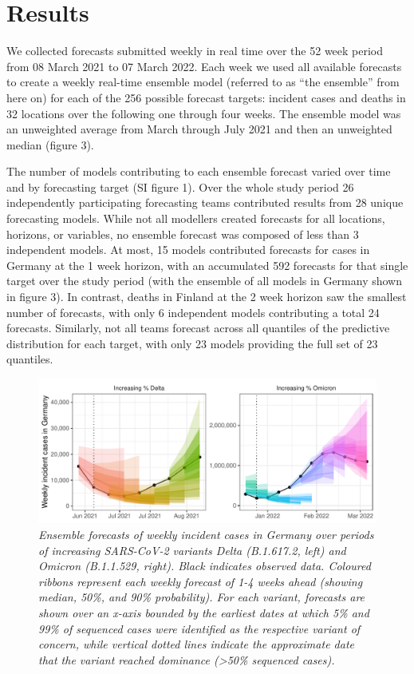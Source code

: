 \documentclass[
]{article}
\begin{document}
\hypertarget{results}{%
\section{Results}\label{results}}

We collected forecasts submitted weekly in real time over the 52 week
period from 08 March 2021 to 07 March 2022. Each week we used all
available forecasts to create a weekly real-time ensemble model
(referred to as ``the ensemble'' from here on) for each of the 256
possible forecast targets: incident cases and deaths in 32 locations
over the following one through four weeks. The ensemble model was an
unweighted average from March through July 2021 and then an unweighted
median (figure 3).

The number of models contributing to each ensemble forecast varied over
time and by forecasting target (SI figure 1). Over the whole study
period 26 independently participating forecasting teams contributed
results from 28 unique forecasting models. While not all modellers
created forecasts for all locations, horizons, or variables, no ensemble
forecast was composed of less than 3 independent models. At most, 15
models contributed forecasts for cases in Germany at the 1 week horizon,
with an accumulated 592 forecasts for that single target over the study
period (with the ensemble of all models in Germany shown in figure 3).
In contrast, deaths in Finland at the 2 week horizon saw the smallest
number of forecasts, with only 6 independent models contributing a total
24 forecasts. Similarly, not all teams forecast across all quantiles of
the predictive distribution for each target, with only 23 models
providing the full set of 23 quantiles.

\begin{figure}
\centering
\includegraphics{abstract-results_files/figure-latex/figure-1-1.pdf}
\caption{\emph{Ensemble forecasts of weekly incident cases in Germany
over periods of increasing SARS-CoV-2 variants Delta (B.1.617.2, left)
and Omicron (B.1.1.529, right). Black indicates observed data. Coloured
ribbons represent each weekly forecast of 1-4 weeks ahead (showing
median, 50\%, and 90\% probability). For each variant, forecasts are
shown over an x-axis bounded by the earliest dates at which 5\% and 99\%
of sequenced cases were identified as the respective variant of concern,
while vertical dotted lines indicate the approximate date that the
variant reached dominance (\textgreater50\% sequenced cases).}}
\end{figure}
\end{document}
